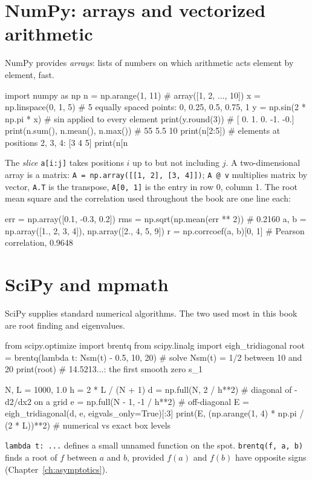 \section{NumPy: arrays and vectorized arithmetic}

NumPy provides \emph{arrays}: lists of numbers on which arithmetic acts element by element, fast.
\begin{pycode}
import numpy as np
n = np.arange(1, 11)          # array([1, 2, ..., 10])
x = np.linspace(0, 1, 5)      # 5 equally spaced points: 0, 0.25, 0.5, 0.75, 1
y = np.sin(2 * np.pi * x)     # sin applied to every element
print(y.round(3))             # [ 0.  1.  0. -1. -0.]
print(n.sum(), n.mean(), n.max())   # 55 5.5 10
print(n[2:5])                 # elements at positions 2, 3, 4: [3 4 5]
print(n[n %
\end{pycode}
The \emph{slice} \texttt{a[i:j]} takes positions $i$ up to but not including $j$. A two-dimensional array is a matrix: \texttt{A = np.array([[1, 2], [3, 4]])}; \texttt{A @ v} multiplies matrix by vector, \texttt{A.T} is the transpose, \texttt{A[0, 1]} is the entry in row 0, column 1. The root mean square and the correlation used throughout the book are one line each:
\begin{pycode}
err = np.array([0.1, -0.3, 0.2])
rms = np.sqrt(np.mean(err ** 2))          # 0.2160
a, b = np.array([1., 2, 3, 4]), np.array([2., 4, 5, 9])
r = np.corrcoef(a, b)[0, 1]               # Pearson correlation, 0.9648
\end{pycode}

\section{SciPy and mpmath}

SciPy supplies standard numerical algorithms. The two used most in this book are root finding and eigenvalues.
\begin{pycode}
from scipy.optimize import brentq
from scipy.linalg import eigh_tridiagonal
root = brentq(lambda t: Nsm(t) - 0.5, 10, 20)   # solve Nsm(t) = 1/2 between 10 and 20
print(root)                                     # 14.5213...: the first smooth zero s_1

N, L = 1000, 1.0
h = 2 * L / (N + 1)
d = np.full(N, 2 / h**2)                        # diagonal of -d2/dx2 on a grid
e = np.full(N - 1, -1 / h**2)                   # off-diagonal
E = eigh_tridiagonal(d, e, eigvals_only=True)[:3]
print(E, (np.arange(1, 4) * np.pi / (2 * L))**2)  # numerical vs exact box levels
\end{pycode}
\texttt{lambda t: ...} defines a small unnamed function on the spot. \texttt{brentq(f, a, b)} finds a root of $f$ between $a$ and $b$, provided $f(a)$ and $f(b)$ have opposite signs (Chapter~\ref{ch:asymptotics}).

